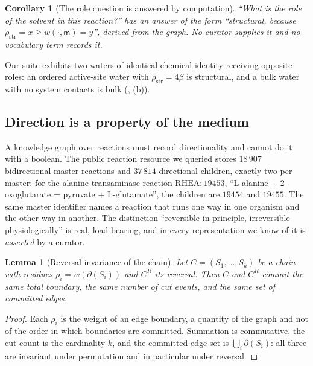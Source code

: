 \documentclass[11pt,twocolumn,a4paper]{article}
\theoremstyle{thmstyle}
\newtheorem{lemma}[theorem]{Lemma}
\newtheorem{corollary}[theorem]{Corollary}
\theoremstyle{definition}
\theoremstyle{remark}
\newcommand{\med}{\mathsf{m}}
\newcommand{\flo}{\beta}
\newcommand{\cut}{\partial}
\begin{document}
\begin{corollary}[The role question is answered by computation]
\label{cor:rolecomputed}
``What is the role of the solvent in this reaction?'' has an answer of the
form ``\textsf{structural}, because $\rho_{\mathrm{str}}=x \geq
w(\cdot,\med)=y$'', derived from the graph. No curator supplies it and no
vocabulary term records it.
\end{corollary}

Our suite exhibits two waters of identical chemical identity receiving
opposite roles: an ordered active-site water with
$\rho_{\mathrm{str}}=4\flo$ is \textsf{structural}, and a bulk water with no
system contacts is \textsf{bulk} (,
(b)).

\subsection{Direction is a property of the medium}

A knowledge graph over reactions must record directionality and cannot do it
with a boolean. The public reaction resource we queried stores
$18\,907$ bidirectional master reactions and $37\,814$ directional children,
exactly two per master: for the alanine transaminase reaction
$\mathrm{RHEA}{:}19453$, ``L-alanine + 2-oxoglutarate = pyruvate +
L-glutamate'', the children are $19454$ and $19455$. The same master
identifier names a reaction that runs one way in one organism and the other
way in another. The distinction ``reversible in principle, irreversible
physiologically'' is real, load-bearing, and in every representation we know
of it is \emph{asserted} by a curator.

\begin{lemma}[Reversal invariance of the chain]
\label{lem:reversal}
Let $C=(S_1,\dots,S_k)$ be a chain with residues $\rho_i=w(\cut(S_i))$ and
$C^R$ its reversal. Then $C$ and $C^R$ commit the same total boundary, the
same number of cut events, and the same set of committed edges.
\end{lemma}

\begin{proof}
Each $\rho_i$ is the weight of an edge boundary, a quantity of the graph and
not of the order in which boundaries are committed. Summation is commutative,
the cut count is the cardinality $k$, and the committed edge set is
$\bigcup_i \cut(S_i)$: all three are invariant under permutation and in
particular under reversal.
\end{proof}
\end{document}
